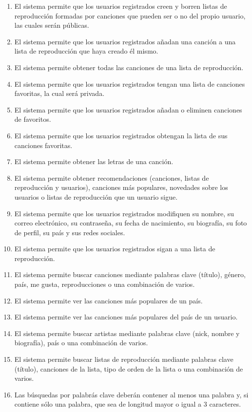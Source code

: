 \documentclass[12pt]{article}%
\begin{document}
\begin{enumerate}
	\item El sistema permite que los usuarios registrados creen y borren listas de reproducci\'on formadas por canciones que pueden ser o no del propio usuario, las cuales ser\'an p\'ublicas.
	\item El sistema permite que los usuarios registrados a\~nadan una canci\'on a una lista de reproducci\'on que haya creado \'el mismo.
	\item El sistema permite obtener todas las canciones de una lista de reproducci\'on.

	\item El sistema permite que los usuarios registrados tengan una lista de canciones favoritas, la cual ser\'a privada.
	\item El sistema permite que los usuarios registrados a\~nadan o eliminen canciones de favoritos.
	\item El sistema permite que los usuarios registrados obtengan la lista de sus canciones favoritas.
	\item El sistema permite obtener las letras de una canci\'on.
	
	\item El sistema permite obtener recomendaciones (canciones, listas de reproducci\'on y usuarios), canciones m\'as populares, novedades sobre los usuarios o listas de reproducci\'on que un usuario sigue. 
	
	\item El sistema permite que los usuarios registrados modifiquen su nombre, su correo electr\'onico, su contrase\~na, su fecha de nacimiento, su biograf\'ia, su foto de perfil, su pa\'is y sus redes sociales.
	\item El sistema permite que los usuarios registrados sigan a una lista de reproducci\'on.
	\item El sistema permite buscar canciones mediante palabras clave (t\'itulo), g\'enero, pa\'is, me gusta, reproducciones o una combinaci\'on de varios.
	\item El sistema permite ver las canciones m\'as populares de un pa\'is.
	\item El sistema permite ver las canciones m\'as populares del pa\'is de un usuario.
	
	\item El sistema permite buscar artistas mediante palabras clave (nick, nombre y biograf\'ia), pa\'is o una combinaci\'on de varios.
	\item El sistema permite buscar listas de reproducci\'on mediante palabras clave (t\'itulo), canciones de la lista, tipo de orden de la lista o una combinaci\'on de varios.
	
	\item Las b\'usquedas por palabr\'as clave deber\'an contener al menos una palabra y, si contiene s\'olo una palabra, que sea de longitud mayor o igual a 3 caracteres.

\end{enumerate}
\end{document}
